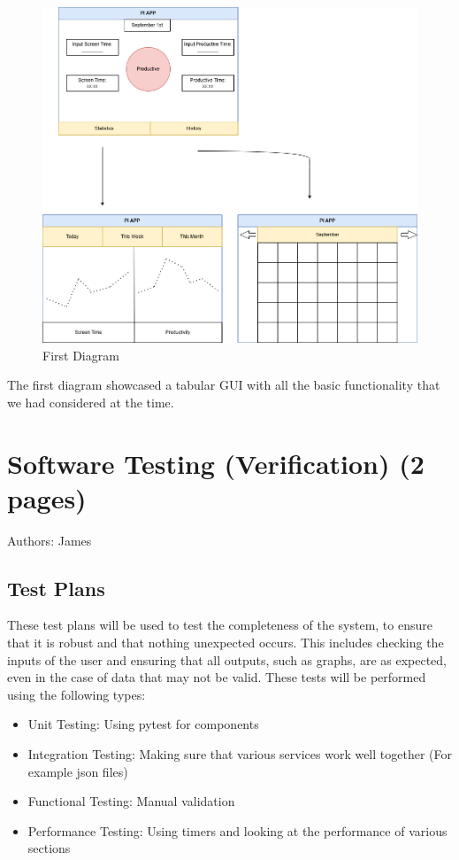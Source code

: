 \documentclass[12pt,a4paper]{article}
\begin{document}
\begin{figure}
    \centering
    \includegraphics[width=0.75\linewidth]{UI Sketch.png}
    \caption{First Diagram}
    \label{fig:enter-label}
\end{figure}

\newpage
The first diagram showcased a tabular GUI with all the basic functionality that we had considered at the time.  


\section{Software Testing (Verification) (2 pages)}
Authors: James
\label{sec:testing}
\subsection{Test Plans}
These test plans will be used to test the completeness of the system, to ensure that it is robust and that nothing unexpected occurs. This includes checking the inputs of the user and ensuring that all outputs, such as graphs, are as expected, even in the case of data that may not be valid. These tests will be performed using the following types:

\begin{itemize}
    \item {Unit Testing}: Using pytest for components
    \item {Integration Testing}: Making sure that various services work well together (For example json files)
    \item {Functional Testing}: Manual validation
    \item {Performance Testing}: Using timers and looking at the performance of various sections
\end{itemize}
\end{document}
